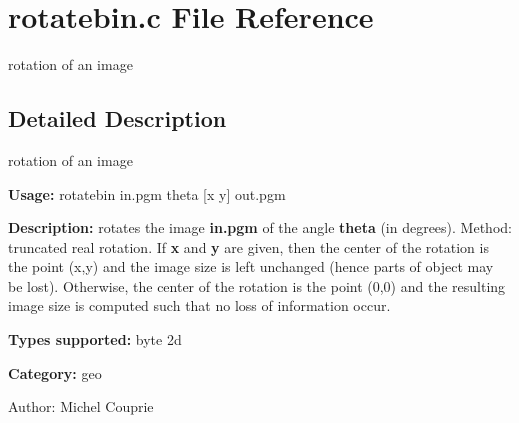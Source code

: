 \section{rotatebin.c File Reference}
\label{rotatebin_8c}
rotation of an image 



\subsection{Detailed Description}
rotation of an image 

{\bf Usage:} rotatebin in.pgm theta [x y] out.pgm

{\bf Description:} rotates the image {\bf in.pgm} of the angle {\bf theta} (in degrees). Method: truncated real rotation. If {\bf x} and {\bf y} are given, then the center of the rotation is the point (x,y) and the image size is left unchanged (hence parts of object may be lost). Otherwise, the center of the rotation is the point (0,0) and the resulting image size is computed such that no loss of information occur.

{\bf Types supported:} byte 2d

{\bf Category:} geo

\begin{Desc}
\item[Author:]Michel Couprie \end{Desc}
